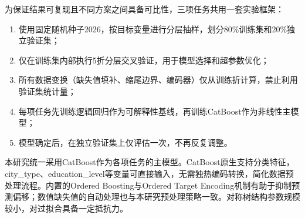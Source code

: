 为保证结果可复现且不同方案之间具备可比性，三项任务共用一套实验框架：

\begin{enumerate}[itemsep=0pt]
\item 使用固定随机种子2026，按目标变量进行分层抽样，划分80\%训练集和20\%独立验证集；
\item 仅在训练集内部执行5折分层交叉验证，用于模型选择和超参数优化；
\item 所有数据变换（缺失值填补、缩尾边界、编码器）仅从训练折计算，禁止利用验证集统计量；
\item 每项任务先训练逻辑回归作为可解释性基线，再训练CatBoost作为非线性主模型；
\item 模型确定后，在独立验证集上仅评估一次，不再反复调整。
\end{enumerate}

本研究统一采用CatBoost\cite{catboost2018}作为各项任务的主模型。CatBoost原生支持分类特征，city\_type、education\_level等变量可直接输入，无需独热编码转换，简化数据预处理流程。内置的Ordered Boosting与Ordered Target Encoding机制有助于抑制预测偏移；数值缺失值的自动处理也与本研究预处理策略一致。对称树结构参数规模较小，对过拟合具备一定抵抗力。
